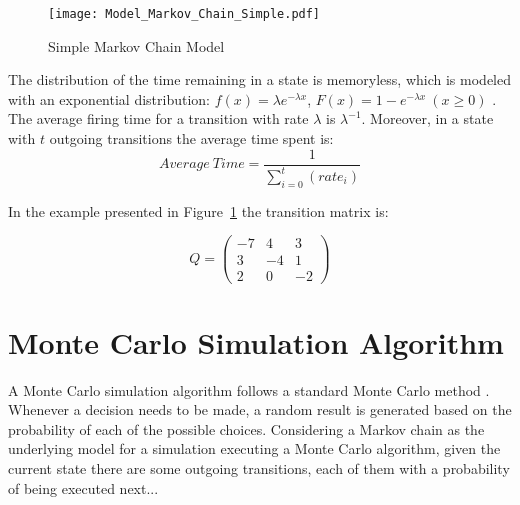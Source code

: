 \begin{figure}[t]
\center
\texttt{[image: Model\_Markov\_Chain\_Simple.pdf]}
\caption{Simple Markov Chain Model}
\label{fig:Simple Markov Chain Model}
\end{figure}

The distribution of the time remaining in a state is memoryless, which is modeled with an exponential distribution: $f(x) = \lambda e^{-\lambda x}$, $F(x) = 1 - e^{-\lambda x} \ (x \geq 0)$ \cite{haas:spn}. The average firing time for a transition with rate $\lambda$ is $\lambda^{-1}$. Moreover, in a state with $t$ outgoing transitions the average time spent is:
$$ Average\ Time = \displaystyle\frac{\displaystyle 1}{\displaystyle\sum\limits_{i=0}^t (rate_i)} $$


In the example presented in Figure~\ref{fig:Simple Markov Chain Model} the transition matrix is:

\[ Q = \left( \begin{array}{ccc}
-7 & 4 & 3 \\
3 & -4 & 1 \\
2 & 0 & -2 \end{array} \right)\]


\section{Monte Carlo Simulation Algorithm} 
A Monte Carlo simulation algorithm follows a standard Monte Carlo method \cite{montecalro}. Whenever a decision needs to be made, a random result is generated based on the probability of each of the possible choices. Considering a Markov chain as the underlying model for a simulation executing a Monte Carlo algorithm, given the current state there are some outgoing transitions, each of them with a probability of being executed next...


